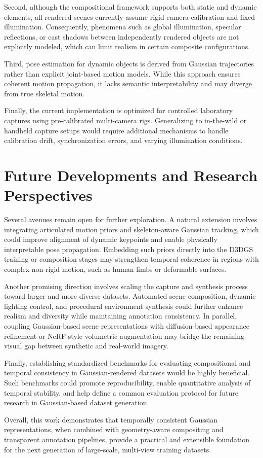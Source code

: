 Second, although the compositional framework supports both static and dynamic elements, all rendered scenes currently assume rigid camera calibration and fixed illumination.
Consequently, phenomena such as global illumination, specular reflections, or cast shadows between independently rendered objects are not explicitly modeled, which can limit realism in certain composite configurations.

Third, pose estimation for dynamic objects is derived from Gaussian trajectories rather than explicit joint-based motion models.
While this approach ensures coherent motion propagation, it lacks semantic interpretability and may diverge from true skeletal motion.

Finally, the current implementation is optimized for controlled laboratory captures using pre-calibrated multi-camera rigs.
Generalizing to in-the-wild or handheld capture setups would require additional mechanisms to handle calibration drift, synchronization errors, and varying illumination conditions.

\section{Future Developments and Research Perspectives}

Several avenues remain open for further exploration.
A natural extension involves integrating articulated motion priors and skeleton-aware Gaussian tracking, which could improve alignment of dynamic keypoints and enable physically interpretable pose propagation.
Embedding such priors directly into the D3DGS training or composition stages may strengthen temporal coherence in regions with complex non-rigid motion, such as human limbs or deformable surfaces.

Another promising direction involves scaling the capture and synthesis process toward larger and more diverse datasets.
Automated scene composition, dynamic lighting control, and procedural environment synthesis could further enhance realism and diversity while maintaining annotation consistency.
In parallel, coupling Gaussian-based scene representations with diffusion-based appearance refinement or NeRF-style volumetric augmentation may bridge the remaining visual gap between synthetic and real-world imagery.

Finally, establishing standardized benchmarks for evaluating compositional and temporal consistency in Gaussian-rendered datasets would be highly beneficial.
Such benchmarks could promote reproducibility, enable quantitative analysis of temporal stability, and help define a common evaluation protocol for future research in Gaussian-based dataset generation.

Overall, this work demonstrates that temporally consistent Gaussian representations, when combined with geometry-aware compositing and transparent annotation pipelines, provide a practical and extensible foundation for the next generation of large-scale, multi-view training datasets.